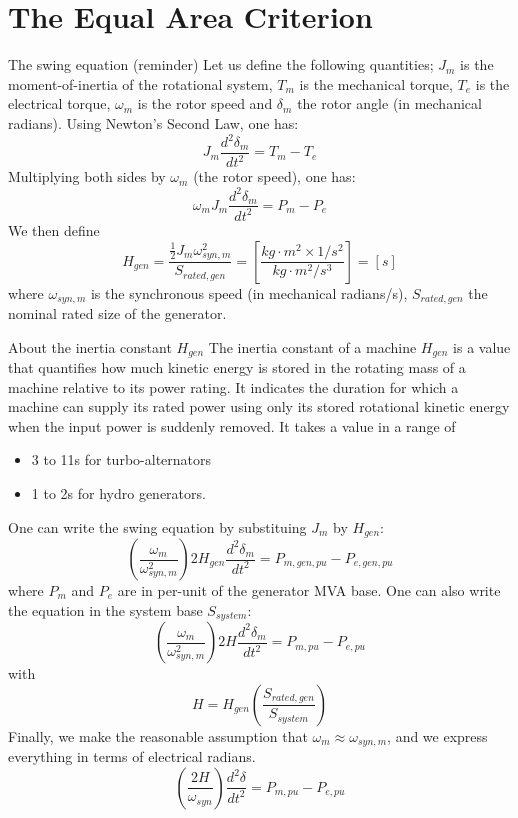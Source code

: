 \section{The Equal Area Criterion}
\begin{frame} [allowframebreaks]{The swing equation (reminder)}
Let us define the following quantities; $J_m$ is the moment-of-inertia of the rotational system, $T_m$ is the mechanical torque, $T_e$ is the electrical torque, $\omega_m$ is the rotor speed and $\delta_m$ the rotor angle (in mechanical radians). Using Newton's Second Law, one has:
$$J_m\frac{d^2\delta_m}{dt^2} = T_m-T_e$$
Multiplying both sides by $\omega_m$ (the rotor speed), one has:
$$\omega_m J_m \frac{d^2\delta_m}{dt^2} = P_m-P_e$$
We then define
$$H_{gen} = \frac{\frac{1}{2}J_m \omega_{syn,m}^2}{S_{rated,gen}} = \left[\frac{kg \cdot m^2 \times 1/s^2}{kg \cdot m^2/s^3}\right] = \left[s\right]$$
where $\omega_{syn,m}$ is the synchronous speed (in mechanical radians/s), $S_{rated,gen}$ the nominal rated size of the generator.

\begin{block}{About the inertia constant $H_{gen}$}
The inertia constant of a machine $H_{gen}$ is a value that quantifies how much kinetic energy is stored in the rotating mass of a machine relative to its power rating. 
It indicates the duration for which a machine can supply its rated power using only its stored rotational kinetic energy when the input power is suddenly removed.
It takes a value in a range of 
\begin{itemize}
    \item 3 to 11s for turbo-alternators
    \item 1 to 2s  for hydro generators.
\end{itemize} 
\end{block}


One can write the swing equation by substituing $J_m$ by $H_{gen}$:
$$\left(\frac{\omega_m}{\omega_{syn,m}^2}\right)2 H_{gen} \frac{d^2\delta_m}{dt^2} = P_{m,gen,pu} - P_{e,gen,pu}$$
where $P_m$ and $P_e$ are in per-unit of the generator MVA base. One can also write the equation in the system base $S_{system}$:
$$\left(\frac{\omega_m}{\omega_{syn,m}^2}\right)2 H \frac{d^2\delta_m}{dt^2} = P_{m,pu} - P_{e,pu}$$
with
$$H = H_{gen} \left(\frac{S_{rated,gen}}{S_{system}}\right)$$
Finally, we make the reasonable assumption that $\omega_m \approx \omega_{syn,m}$, and we express everything in terms of electrical radians.
\begin{equation}
\left(\frac{2H}{\omega_{syn}}\right) \frac{d^2\delta}{dt^2} = P_{m,pu} - P_{e,pu} \label{eq:swing}
\end{equation}

\end{frame}

